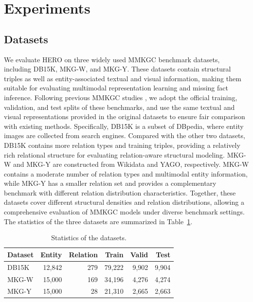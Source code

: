 \documentclass[a4paper,fleqn]{cas-sc}
\begin{document}
\section{Experiments}
\label{sec:experiments}
\subsection{Datasets}

We evaluate HERO on three widely used MMKGC benchmark datasets, including DB15K, MKG-W, and MKG-Y. These datasets contain structural triples as well as entity-associated textual and visual information, making them suitable for evaluating multimodal representation learning and missing fact inference. Following previous MMKGC studies \cite{li2023imf,zhang2025momok,liu2026mhyper}, we adopt the official training, validation, and test splits of these benchmarks, and use the same textual and visual representations provided in the original datasets to ensure fair comparison with existing methods.
Specifically, DB15K is a subset of DBpedia, where entity images are collected from search engines. Compared with the other two datasets, DB15K contains more relation types and training triples, providing a relatively rich relational structure for evaluating relation-aware structural modeling. MKG-W and MKG-Y are constructed from Wikidata and YAGO, respectively. MKG-W contains a moderate number of relation types and multimodal entity information, while MKG-Y has a smaller relation set and provides a complementary benchmark with different relation distribution characteristics. Together, these datasets cover different structural densities and relation distributions, allowing a comprehensive evaluation of MMKGC models under diverse benchmark settings.
The statistics of the three datasets are summarized in Table~\ref{tab:datasets}. 

\begin{table}[t]
\centering
\caption{Statistics of the datasets.}
\label{tab:datasets}
\begin{tabular}{lrrrrr}
\toprule
\textbf{Dataset} & \textbf{Entity} & \textbf{Relation} & \textbf{Train} & \textbf{Valid} & \textbf{Test} \\
\midrule
DB15K & 12,842 & 279 & 79,222 & 9,902 & 9,904 \\
MKG-W & 15,000 & 169 & 34,196 & 4,276 & 4,274 \\
MKG-Y & 15,000 & 28 & 21,310 & 2,665 & 2,663 \\
\bottomrule
\end{tabular}
\end{table}
\end{document}
